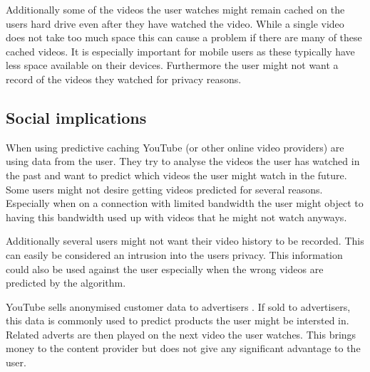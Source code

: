 Additionally some of the videos the user watches might remain cached on the users hard drive even after they have watched the video. While a single video does not take too much space this can cause a problem if there are many of these cached videos. It is especially important for mobile users as these typically have less space available on their devices. Furthermore the user might not want a record of the videos they watched for privacy reasons. 

\subsection{Social implications}
When using predictive caching YouTube (or other online video providers) are using data from the user. They try to analyse the videos the user has watched in the past and want to predict which videos the user might watch in the future. Some users might not desire getting videos predicted for several reasons. Especially when on a connection with limited bandwidth the user might object to having this bandwidth used up with videos that he might not watch anyways. 

Additionally several users might not want their video history to be recorded. This can easily be considered an intrusion into the users privacy. This information could also be used against the user  especially when the wrong videos are predicted by the algorithm. 

YouTube sells anonymised customer data to advertisers . If sold to advertisers, this data is commonly used to predict products the user might be intersted in. Related adverts are then played on the next video the user watches. This brings money to the content provider but does not give any significant advantage to the user. 